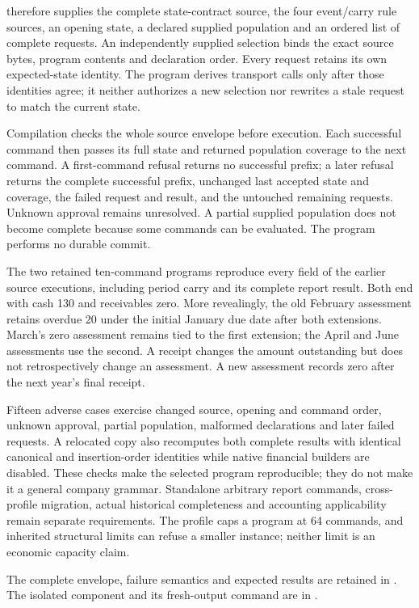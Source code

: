  therefore supplies the complete state-contract
source, the four event/carry rule sources, an opening state, a declared supplied
population and an ordered list of complete requests. An independently supplied
selection binds the exact source bytes, program contents and declaration order.
Every request retains its own expected-state identity. The program derives
transport calls only after those identities agree; it neither authorizes a
new selection nor rewrites a stale request to match the current state.

Compilation checks the whole source envelope before execution. Each successful
command then passes its full state and returned population coverage to the next
command. A first-command refusal returns no successful prefix; a later refusal
returns the complete successful prefix, unchanged last accepted state and
coverage, the failed request and result, and the untouched remaining requests.
Unknown approval remains unresolved. A partial supplied population does not
become complete because some commands can be evaluated. The program performs
no durable commit.

The two retained ten-command programs reproduce every field of the earlier
source executions, including period carry and its complete report result.
Both end with cash 130 and receivables zero. More revealingly, the old February
assessment retains overdue 20 under the initial January due date after both
extensions. March's zero assessment remains tied to the first extension;
the April and June assessments use the second. A receipt changes the amount
outstanding but does not retrospectively change an assessment. A new assessment
records zero after the next year's final receipt.

Fifteen adverse cases exercise changed source, opening and command order,
unknown approval, partial population, malformed declarations and later failed
requests. A relocated copy also recomputes both complete results with identical
canonical and insertion-order identities while native financial builders are
disabled. These checks make the selected program reproducible; they do not
make it a general company grammar. Standalone arbitrary report commands,
cross-profile migration, actual historical completeness and accounting
applicability remain separate requirements. The profile caps a program at
64 commands, and inherited structural limits can refuse a smaller instance;
neither limit is an economic capacity claim.

\begingroup\raggedright\begin{samepage}
The complete envelope, failure semantics and expected results are retained in
. The isolated
component and its fresh-output command are in
.
\par\end{samepage}\endgroup
